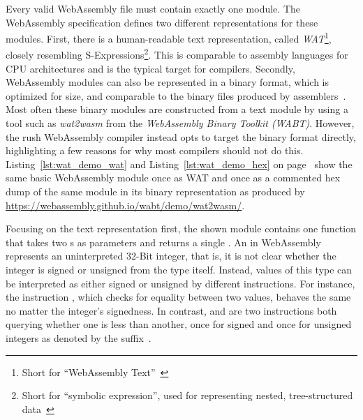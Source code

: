 Every valid WebAssembly file must contain exactly one module.
The WebAssembly specification defines two different representations for these modules.
First, there is a human-readable text representation, called \emph{WAT}\footnote{Short for \enquote{WebAssembly Text}~\cite[p.~40]{Sendil2022-fy}}, closely resembling S-Expressions\footnote{Short for \enquote{symbolic expression}, used for representing  nested, tree-structured data~\cite[p.~41]{Sendil2022-fy}}.
This is comparable to assembly languages for CPU architectures and is the typical target for compilers.
Secondly, WebAssembly modules can also be represented in a binary format, which is optimized for size, and comparable to the binary files produced by assemblers~\cite[pp.~40--44]{Sendil2022-fy}.
Most often these binary modules are constructed from a text module by using a tool such as \emph{wat2wasm} from the \emph{WebAssembly Binary Toolkit (WABT)}.
However, the rush WebAssembly compiler instead opts to target the binary format directly, highlighting a few reasons for why most compilers should not do this.
Listing~\ref{lst:wat_demo_wat} and Listing~\ref{lst:wat_demo_hex} on page~\pageref{lst:wat_demo_wat} show the same basic WebAssembly module once as WAT and once as a commented hex dump of the same module in its binary representation as produced by \url{https://webassembly.github.io/wabt/demo/wat2wasm/}.


Focusing on the text representation first, the shown module contains one function that takes two s as parameters and returns a single .
An  in WebAssembly represents an uninterpreted 32-Bit integer, that is, it is not clear whether the integer is signed or unsigned from the type itself.
Instead, values of this type can be interpreted as either signed or unsigned by different instructions.
For instance, the instruction , which checks for equality between two  values, behaves the same no matter the integer's signedness.
In contrast,  and  are two instructions both querying whether one  is less than another, once for signed and once for unsigned integers as denoted by the suffix~\cite[p.46]{Sendil2022-fy}.


